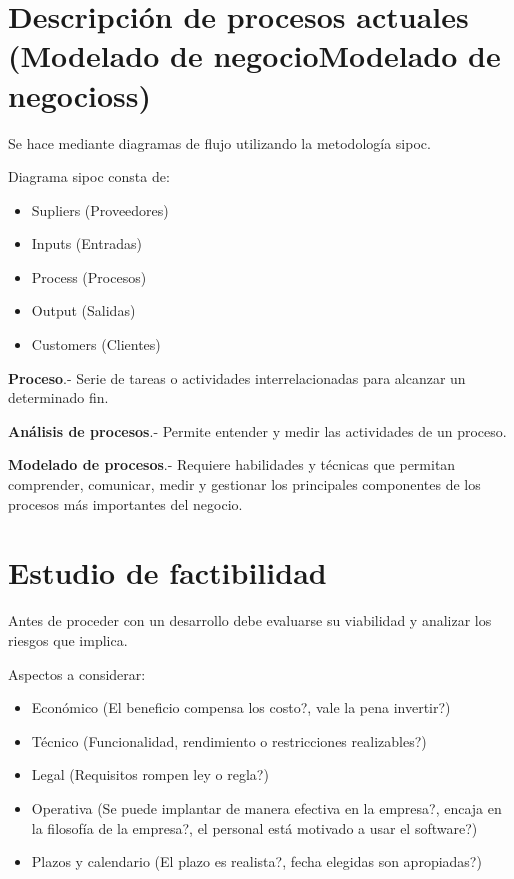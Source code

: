 \documentclass{article}
\begin{document}
\section{Descripción de procesos actuales (Modelado de negocioModelado de negocioss)}

Se hace mediante diagramas de flujo utilizando la metodología sipoc.

\vspace{1em}
Diagrama sipoc consta de:

\begin{itemize}
	\item
		Supliers (Proveedores)
	\item
		Inputs (Entradas)
	\item
		Process (Procesos)
	\item
		Output (Salidas)
	\item
		Customers (Clientes)
\end{itemize}

\vspace{1em}
\textbf{Proceso}.- Serie de tareas o actividades interrelacionadas para alcanzar
un determinado fin.

\vspace{1em}
\textbf{Análisis de procesos}.- Permite entender y medir las actividades de un
proceso.

\vspace{1em}
\textbf{Modelado de procesos}.- Requiere habilidades y técnicas que permitan
comprender, comunicar, medir y gestionar los principales componentes de los
procesos más importantes del negocio.

\section{Estudio de factibilidad}

Antes de proceder con un desarrollo debe evaluarse su viabilidad y analizar los
riesgos que implica.

\vspace{1em}
Aspectos a considerar:

\begin{itemize}
	\item
		Económico (El beneficio compensa los costo?, vale la pena invertir?)
	\item
		Técnico (Funcionalidad, rendimiento o restricciones realizables?)
	\item
		Legal (Requisitos rompen ley o regla?)
	\item
		Operativa (Se puede implantar de manera efectiva en la empresa?,
		encaja en la filosofía de la empresa?, el personal está motivado
		a usar el software?)
	\item
		Plazos y calendario (El plazo es realista?, fecha elegidas son
		apropiadas?)
\end{itemize}
\end{document}
